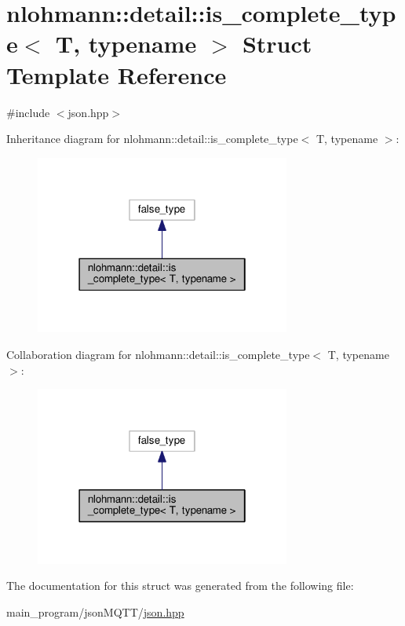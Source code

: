 \hypertarget{structnlohmann_1_1detail_1_1is__complete__type}{}\section{nlohmann\+:\+:detail\+:\+:is\+\_\+complete\+\_\+type$<$ T, typename $>$ Struct Template Reference}
\label{structnlohmann_1_1detail_1_1is__complete__type}


{\ttfamily \#include $<$json.\+hpp$>$}



Inheritance diagram for nlohmann\+:\+:detail\+:\+:is\+\_\+complete\+\_\+type$<$ T, typename $>$\+:
\nopagebreak
\begin{figure}[H]
\begin{center}
\leavevmode
\includegraphics[width=238pt]{structnlohmann_1_1detail_1_1is__complete__type__inherit__graph}
\end{center}
\end{figure}


Collaboration diagram for nlohmann\+:\+:detail\+:\+:is\+\_\+complete\+\_\+type$<$ T, typename $>$\+:
\nopagebreak
\begin{figure}[H]
\begin{center}
\leavevmode
\includegraphics[width=238pt]{structnlohmann_1_1detail_1_1is__complete__type__coll__graph}
\end{center}
\end{figure}


The documentation for this struct was generated from the following file\+:\begin{DoxyCompactItemize}
\item 
main\+\_\+program/json\+M\+Q\+T\+T/\hyperlink{json_8hpp}{json.\+hpp}\end{DoxyCompactItemize}

